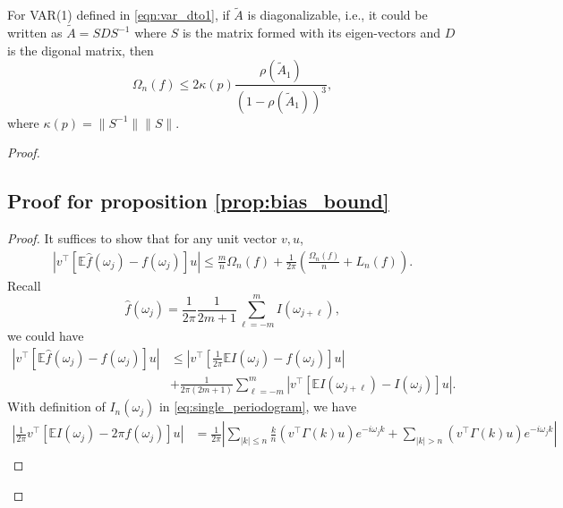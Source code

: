 For VAR(1) defined in \eqref{eqn:var_dto1}, if $\tilde{A}$ is diagonalizable, i.e., it could be written as $\tilde{A}=SDS^{-1}$ where 
$S$ is the matrix formed with its eigen-vectors and $D$ is the digonal matrix, then
\begin{equation}
\Omega_n(f) \le 2\kappa(p)\frac{\rho(\tilde{A}_1)}{(1-\rho(\tilde{A}_1))^3}, 
\end{equation}
where $\kappa(p) = \|S^{-1}\|\|S\|$.
\begin{proof}



\subsection*{Proof for proposition \ref{prop:bias_bound}}
\begin{proof}
It suffices to show that for any unit vector $v,u$, 
\begin{equation}
\begin{aligned}
\left|v^\top \left[\mathbb{E}\hat{f}(\omega_j) - f(\omega_j)\right]u\right| \le \frac{m}{n}\Omega_n(f) + \frac{1}{2\pi}\left(\frac{\Omega_n(f)}{n}+L_n(f)\right). 
\end{aligned}
\end{equation}
Recall 
\begin{equation}
\hat{f}(\omega_j) = \frac{1}{2\pi}\frac{1}{2m+1} \sum_{\ell =-m}^m I(\omega_{j+\ell}), 
\end{equation}
we could have 
\begin{equation}
\label{eq:mul_dev}
\begin{aligned}
\left|v^\top \left[\mathbb{E}\hat{f}(\omega_j) - f(\omega_j)\right]u\right| 
&\le \left|v^\top \left[\frac{1}{2\pi}\mathbb{E}I(\omega_j) - f(\omega_j)\right]u\right|\\
&+\frac{1}{2\pi(2m+1)} \sum_{\ell = -m}^m |v^\top\left[\mathbb{E}I(\omega_{j+\ell}) - I(\omega_{j})\right]u|.
\end{aligned}
\end{equation}
With definition of $I_n(\omega_j)$ in \eqref{eq:single_periodogram}, we have 
\begin{equation}
\label{eq:mul_dev1}
\begin{aligned}
\left|\frac{1}{2\pi} v^\top \left[\mathbb{E} I(\omega_j) - 2\pi f(\omega_j)\right]u\right| &= \frac{1}{2\pi}\left|\sum_{|k|\le n} \frac{k}{n}  (v^\top \Gamma(k)u) e^{-i\omega_j k}+\sum_{|k|>n} (v^\top \Gamma(k)u) e^{-i\omega_jk}\right|\\

\end{aligned}
\end{equation}
\end{proof}
\end{proof}
